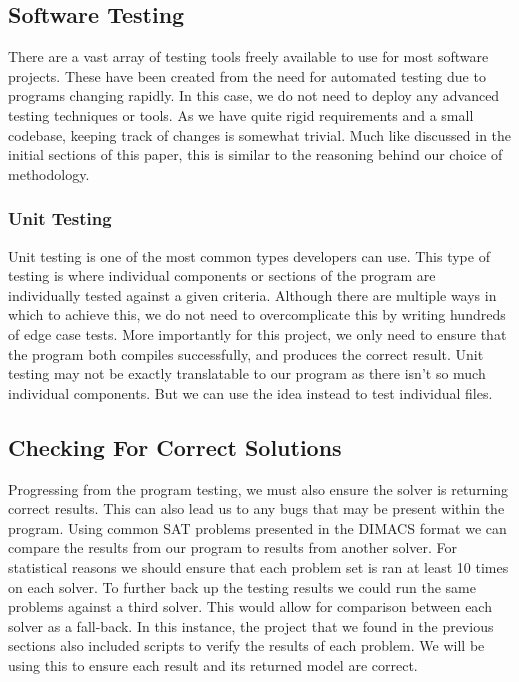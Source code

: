 \documentclass{article}
\begin{document}
\subsection{Software Testing}
There are a vast array of testing tools freely available to use for most software projects. These
have been created from the need for automated testing due to programs changing rapidly. In this
case, we do not need to deploy any advanced testing techniques or tools. As we have quite rigid
requirements and a small codebase, keeping track of changes is somewhat trivial. Much like discussed
in the initial sections of this paper, this is similar to the reasoning behind our choice of
methodology.

\subsubsection{Unit Testing}
Unit testing is one of the most common types developers can use. This type of testing is where individual components or sections
of the program are individually tested against a given criteria. Although there are multiple ways in which to achieve this, we do
not need to overcomplicate this by writing hundreds of edge case tests. More importantly for this project, we only need to ensure
that the program both compiles successfully, and produces the correct result. Unit testing may not be exactly translatable to our program as there isn't so much individual components. But we can use the idea instead to test individual files.

\subsection{Checking For Correct Solutions}
Progressing from the program testing, we must also ensure the solver is returning correct results.
This can also lead us to any bugs that may be present within the program. Using common SAT problems
presented in the DIMACS format we can compare the results from our program to results from another
solver. For statistical reasons we should ensure that each problem set is ran at least 10 times on
each solver. To further back up the testing results we could run the same problems against a third
solver. This would allow for comparison between each solver as a fall-back. In this instance, the project that we found in the
previous sections also included scripts to verify the results of each problem. We will be using this to ensure each result and its
returned model are correct.
\end{document}
